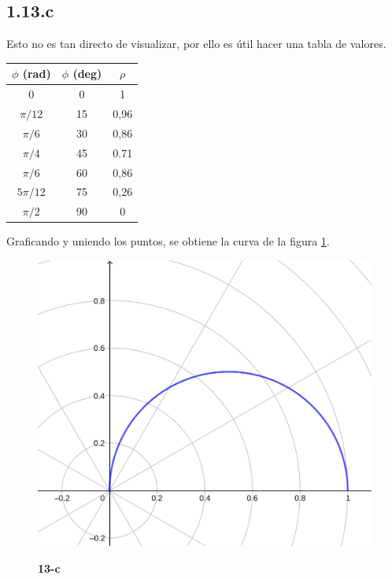 \documentclass{article}
\begin{document}
\subsection*{1.13.c}
\label{subsec:1.13.c}

Esto no es tan directo de visualizar, por ello es útil hacer una tabla de valores.

\begin{center}
\begin{tabular}{ |c|c|c| }
 \hline
 $\phi$ (rad) & $\phi$ (deg) & $\rho$ \\ [0.5ex] 
 \hline\hline
 \hline
 0 & 0 & 1 \\ 
 $\pi/12$ & 15 & 0,96 \\ 
 $\pi/6$ & 30 & 0,86 \\
 $\pi/4$ & 45 & 0.71 \\
 $\pi/6$ & 60 & 0,86 \\
 $5\pi/12$ & 75 & 0,26 \\
 $\pi/2$ & 90 & 0 \\
 \hline
\end{tabular}
\end{center}

Graficando y uniendo los puntos, se obtiene la curva de la figura \ref{fig:1-13-c}.

\begin{figure}[ht]
\caption{\textbf{13-c}}
\includegraphics[scale=4.5]{../img/exercises/guide_01/13_c.png} 
\centering
\label{fig:1-13-c}
\end{figure}
\end{document}

